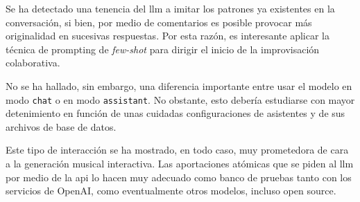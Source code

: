 Se ha detectado una tenencia del \gls{llm} a imitar los patrones ya existentes en la conversación, si bien, por medio de comentarios es posible provocar más originalidad en sucesivas respuestas. Por esta razón, es interesante aplicar la técnica de prompting de \emph{few-shot} para dirigir el inicio de la improvisación colaborativa. 

No se ha hallado, sin embargo, una diferencia importante entre usar el modelo en modo \texttt{chat} o en modo \texttt{assistant}. No obstante, esto debería estudiarse con mayor detenimiento en función de unas cuidadas configuraciones de asistentes y de sus archivos de base de datos.

Este tipo de interacción se ha mostrado, en todo caso, muy prometedora de cara a la generación musical interactiva. Las aportaciones atómicas que se piden al \gls{llm} por medio de la \gls{api} lo hacen muy adecuado como banco de pruebas tanto con los servicios de OpenAI, como eventualmente otros modelos, incluso open source.

